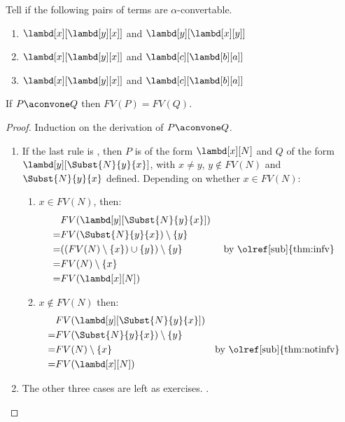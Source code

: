 \documentclass[../../../include/open-logic-section]{subfiles}
\begin{document}
\begin{prob}
  Tell if the following pairs of terms are $\alpha$-convertable.
  \begin{enumerate}
  \item $\lambd[x][\lambd[y][x]]$ and $\lambd[y][\lambd[x][y]]$
  \item $\lambd[x][\lambd[y][x]]$ and $\lambd[c][\lambd[b][a]]$
  \item $\lambd[x][\lambd[y][x]]$ and $\lambd[c][\lambd[b][a]]$
  \end{enumerate}
\end{prob}

\begin{lem}
  If $P \aconvone Q$ then $FV(P) = FV(Q)$.
\end{lem}
\begin{proof}
  Induction on the derivation of $P \aconvone Q$.
  \begin{enumerate}
  \item If the last rule is , then $P$ is of the form
    $\lambd[x][N]$ and $Q$ of the form
    $\lambd[y][\Subst{N}{y}{x}]$, with $x \neq y$, $y \notin
    FV(N)$ and $\Subst{N}{y}{x}$ defined. Depending on whether
    $x \in FV(N)$:
    \begin{enumerate}
    \item $x \in FV(N)$, then:
      \begin{align*}
        &FV(\lambd[y][\Subst{N}{y}{x}])\\
        =&FV(\Subst{N}{y}{x}) \setminus \{y\} \\
        =&((FV(N) \setminus \{x\}) \cup \{y\}) \setminus \{y\}
         && \text{ by \olref[sub]{thm:infv}} \\
        =&FV(N) \setminus \{x\} \\
        =&FV(\lambd[x][N])
      \end{align*}
    \item $x \notin FV(N)$ then:
      \begin{align*}
        &FV(\lambd[y][\Subst{N}{y}{x}])\\
        =&FV(\Subst{N}{y}{x}) \setminus \{y\} \\
        =&FV(N) \setminus \{x\}
         && \text{by \olref[sub]{thm:notinfv}} \\
        =&FV(\lambd[x][N])
      \end{align*}
    \end{enumerate}
  \item The other three cases are left as exercises. .
  \end{enumerate}
\end{proof}
\end{document}
